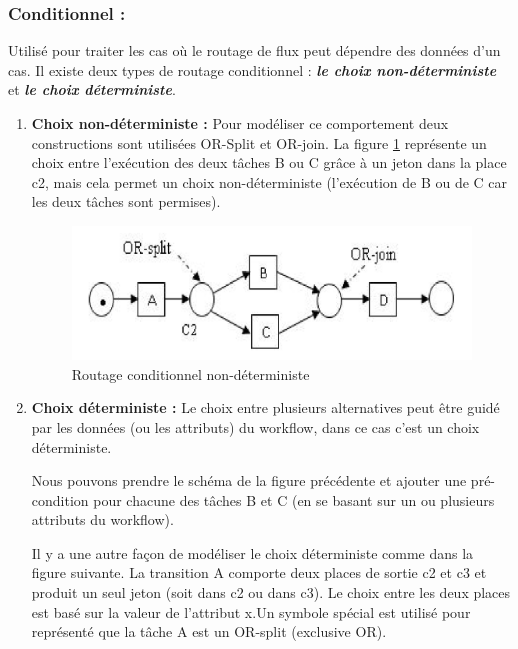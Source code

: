 \subsubsection{Conditionnel :}

Utilisé pour traiter les cas où le routage de flux peut dépendre des données d’un cas. Il existe deux types de routage conditionnel : \textit{\textbf{le choix non-déterministe}} et \textit{\textbf{le choix déterministe}}. 


\begin{enumerate}

\item \textbf{Choix non-déterministe :} Pour modéliser ce comportement deux constructions sont utilisées OR-Split et OR-join. La figure \ref{fig:wf005} représente un choix entre l’exécution des deux tâches B ou C grâce à un jeton dans la place c2, mais cela permet un choix non-déterministe (l’exécution de B ou de C car les deux tâches sont permises).



\begin{figure}[H]
	\centering
	\includegraphics[width=0.7\linewidth]{images/wf005}
	\caption{Routage conditionnel non-déterministe}
	\label{fig:wf005}
\end{figure}



\item \textbf{Choix déterministe : } Le choix entre plusieurs alternatives peut être guidé par les données (ou les attributs) du workflow, dans ce cas c’est un choix déterministe.

Nous pouvons prendre le schéma de la ﬁgure précédente et ajouter une pré-condition pour chacune des tâches B et C (en se basant sur un ou plusieurs attributs du workflow).

Il y a une autre façon de modéliser le choix déterministe comme dans la ﬁgure suivante. La transition A comporte deux places de sortie c2 et c3 et produit un seul jeton (soit dans c2 ou dans c3). Le choix entre les deux places est basé sur la valeur de l’attribut x.Un symbole spécial est utilisé pour représenté que la tâche A est un OR-split (exclusive OR).
















\end{enumerate}
